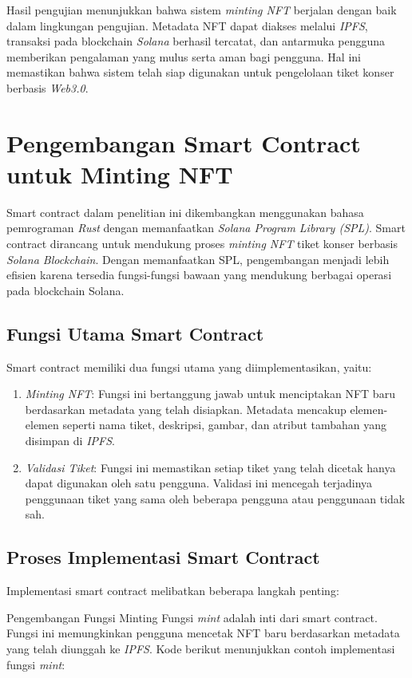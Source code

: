 Hasil pengujian menunjukkan bahwa sistem \textit{minting NFT} berjalan dengan baik dalam lingkungan pengujian. Metadata NFT dapat diakses melalui \textit{IPFS}, transaksi pada blockchain \textit{Solana} berhasil tercatat, dan antarmuka pengguna memberikan pengalaman yang mulus serta aman bagi pengguna. Hal ini memastikan bahwa sistem telah siap digunakan untuk pengelolaan tiket konser berbasis \textit{Web3.0}.

\section{Pengembangan Smart Contract untuk Minting NFT}

Smart contract dalam penelitian ini dikembangkan menggunakan bahasa pemrograman \textit{Rust} dengan memanfaatkan \textit{Solana Program Library (SPL)}. Smart contract dirancang untuk mendukung proses \textit{minting NFT} tiket konser berbasis \textit{Solana Blockchain}. Dengan memanfaatkan SPL, pengembangan menjadi lebih efisien karena tersedia fungsi-fungsi bawaan yang mendukung berbagai operasi pada blockchain Solana.

\subsection{Fungsi Utama Smart Contract}
Smart contract memiliki dua fungsi utama yang diimplementasikan, yaitu:

\begin{enumerate}
    \item \textit{Minting NFT}: Fungsi ini bertanggung jawab untuk menciptakan NFT baru berdasarkan metadata yang telah disiapkan. Metadata mencakup elemen-elemen seperti nama tiket, deskripsi, gambar, dan atribut tambahan yang disimpan di \textit{IPFS}.
    \item \textit{Validasi Tiket}: Fungsi ini memastikan setiap tiket yang telah dicetak hanya dapat digunakan oleh satu pengguna. Validasi ini mencegah terjadinya penggunaan tiket yang sama oleh beberapa pengguna atau penggunaan tidak sah.
\end{enumerate}

\subsection{Proses Implementasi Smart Contract}
Implementasi smart contract melibatkan beberapa langkah penting:

Pengembangan Fungsi Minting
Fungsi \textit{mint} adalah inti dari smart contract. Fungsi ini memungkinkan pengguna mencetak NFT baru berdasarkan metadata yang telah diunggah ke \textit{IPFS}. Kode berikut menunjukkan contoh implementasi fungsi \textit{mint}:

